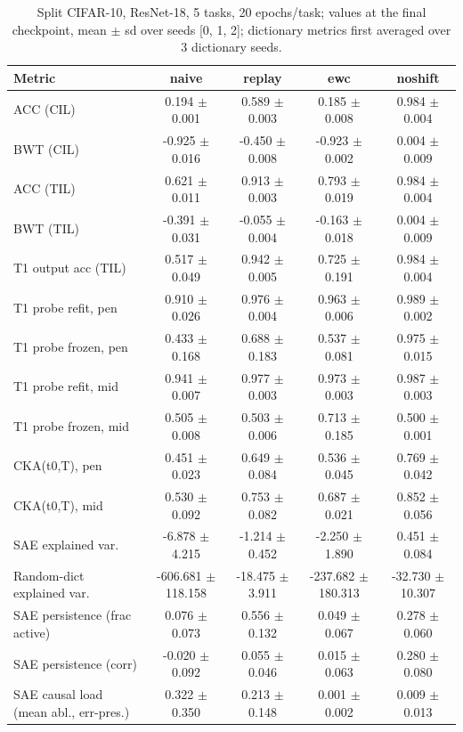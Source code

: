 \begin{table}[t]
\centering\small
\caption{Split CIFAR-10, ResNet-18, 5 tasks, 20 epochs/task; values at the final checkpoint, mean $\pm$ sd over seeds [0, 1, 2]; dictionary metrics first averaged over 3 dictionary seeds.}
\begin{tabular}{lcccc}
\toprule
Metric & naive & replay & ewc & noshift \\
\midrule
ACC (CIL) & 0.194 $\pm$ 0.001 & 0.589 $\pm$ 0.003 & 0.185 $\pm$ 0.008 & 0.984 $\pm$ 0.004 \\
BWT (CIL) & -0.925 $\pm$ 0.016 & -0.450 $\pm$ 0.008 & -0.923 $\pm$ 0.002 & 0.004 $\pm$ 0.009 \\
ACC (TIL) & 0.621 $\pm$ 0.011 & 0.913 $\pm$ 0.003 & 0.793 $\pm$ 0.019 & 0.984 $\pm$ 0.004 \\
BWT (TIL) & -0.391 $\pm$ 0.031 & -0.055 $\pm$ 0.004 & -0.163 $\pm$ 0.018 & 0.004 $\pm$ 0.009 \\
T1 output acc (TIL) & 0.517 $\pm$ 0.049 & 0.942 $\pm$ 0.005 & 0.725 $\pm$ 0.191 & 0.984 $\pm$ 0.004 \\
T1 probe refit, pen & 0.910 $\pm$ 0.026 & 0.976 $\pm$ 0.004 & 0.963 $\pm$ 0.006 & 0.989 $\pm$ 0.002 \\
T1 probe frozen, pen & 0.433 $\pm$ 0.168 & 0.688 $\pm$ 0.183 & 0.537 $\pm$ 0.081 & 0.975 $\pm$ 0.015 \\
T1 probe refit, mid & 0.941 $\pm$ 0.007 & 0.977 $\pm$ 0.003 & 0.973 $\pm$ 0.003 & 0.987 $\pm$ 0.003 \\
T1 probe frozen, mid & 0.505 $\pm$ 0.008 & 0.503 $\pm$ 0.006 & 0.713 $\pm$ 0.185 & 0.500 $\pm$ 0.001 \\
CKA(t0,T), pen & 0.451 $\pm$ 0.023 & 0.649 $\pm$ 0.084 & 0.536 $\pm$ 0.045 & 0.769 $\pm$ 0.042 \\
CKA(t0,T), mid & 0.530 $\pm$ 0.092 & 0.753 $\pm$ 0.082 & 0.687 $\pm$ 0.021 & 0.852 $\pm$ 0.056 \\
SAE explained var. & -6.878 $\pm$ 4.215 & -1.214 $\pm$ 0.452 & -2.250 $\pm$ 1.890 & 0.451 $\pm$ 0.084 \\
Random-dict explained var. & -606.681 $\pm$ 118.158 & -18.475 $\pm$ 3.911 & -237.682 $\pm$ 180.313 & -32.730 $\pm$ 10.307 \\
SAE persistence (frac active) & 0.076 $\pm$ 0.073 & 0.556 $\pm$ 0.132 & 0.049 $\pm$ 0.067 & 0.278 $\pm$ 0.060 \\
SAE persistence (corr) & -0.020 $\pm$ 0.092 & 0.055 $\pm$ 0.046 & 0.015 $\pm$ 0.063 & 0.280 $\pm$ 0.080 \\
SAE causal load (mean abl., err-pres.) & 0.322 $\pm$ 0.350 & 0.213 $\pm$ 0.148 & 0.001 $\pm$ 0.002 & 0.009 $\pm$ 0.013 \\

\end{tabular}
\end{table}
